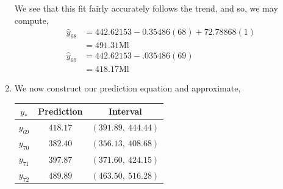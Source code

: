 \documentclass[letterpaper,10pt]{article}
\begin{document}
\begin{enumerate}
We see that this fit fairly accurately follows the trend, and so, we may compute,
\begin{align*}
\hat{y}_{68} &= 442.62153-0.35486(68)+72.78868(1)\\
&= 491.31\text{Ml}\\
\hat{y}_{69} &= 442.62153-.035486(69)\\
&= 418.17\text{Ml}
\end{align*}
\item We now construct our prediction equation and approximate,
\begin{center}
\begin{tabular}{|c|c|c|}
\hline
$y_*$ & Prediction & Interval \\\hline
$y_{69}$ & $418.17$ & $(391.89,\ 444.44)$\\
$y_{70}$ & $382.40$ & $(356.13,\ 408.68)$\\
$y_{71}$ & $397.87$ & $(371.60,\ 424.15)$\\
$y_{72}$ & $489.89$ & $(463.50,\ 516.28)$\\\hline
\end{tabular}
\end{center}
\end{enumerate}
\end{document}
